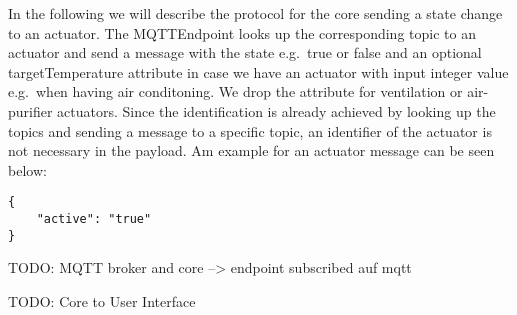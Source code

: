 In the following we will describe the protocol for the core sending a
state change to an actuator. The MQTTEndpoint looks up the corresponding
topic to an actuator and send a message with the state e.g.~true or
false and an optional targetTemperature attribute in case we have an
actuator with input integer value e.g.~when having air conditoning. We
drop the attribute for ventilation or air-purifier actuators. Since the
identification is already achieved by looking up the topics and sending
a message to a specific topic, an identifier of the actuator is not
necessary in the payload. Am example for an actuator message can be seen
below:

\begin{verbatim}
{
    "active": "true"
}
\end{verbatim}

TODO: MQTT broker and core --\textgreater{} endpoint subscribed auf mqtt

TODO: Core to User Interface